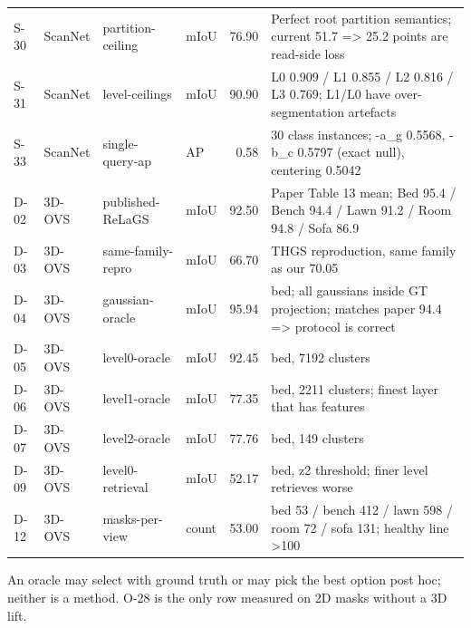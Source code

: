 \begin{table}[t]
\begin{tabular}{llllrp{5.6cm}}
S-30 & ScanNet & partition-ceiling & mIoU & 76.90 & Perfect root partition semantics; current 51.7 => 25.2 points are read-side loss \\
S-31 & ScanNet & level-ceilings & mIoU & 90.90 & L0 0.909 / L1 0.855 / L2 0.816 / L3 0.769; L1/L0 have over-segmentation artefacts \\
S-33 & ScanNet & single-query-ap & AP & 0.58 & 30 class instances; -a\_g 0.5568, -b\_c 0.5797 (exact null), centering 0.5042 \\
D-02 & 3D-OVS & published-ReLaGS & mIoU & 92.50 & Paper Table 13 mean; Bed 95.4 / Bench 94.4 / Lawn 91.2 / Room 94.8 / Sofa 86.9 \\
D-03 & 3D-OVS & same-family-repro & mIoU & 66.70 & THGS reproduction, same family as our 70.05 \\
D-04 & 3D-OVS & gaussian-oracle & mIoU & 95.94 & bed; all gaussians inside GT projection; matches paper 94.4 => protocol is correct \\
D-05 & 3D-OVS & level0-oracle & mIoU & 92.45 & bed, 7192 clusters \\
D-06 & 3D-OVS & level1-oracle & mIoU & 77.35 & bed, 2211 clusters; finest layer that has features \\
D-07 & 3D-OVS & level2-oracle & mIoU & 77.76 & bed, 149 clusters \\
D-09 & 3D-OVS & level0-retrieval & mIoU & 52.17 & bed, z2 threshold; finer level retrieves worse \\
D-12 & 3D-OVS & masks-per-view & count & 53.00 & bed 53 / bench 412 / lawn 598 / room 72 / sofa 131; healthy line >100 \\
\bottomrule
\end{tabular}
\par\smallskip\footnotesize An oracle may select with ground truth or may pick the best option post hoc; neither is a method. O-28 is the only row measured on 2D masks without a 3D lift.
\end{table}
